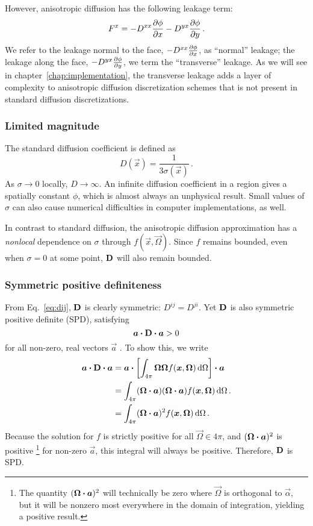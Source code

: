However, anisotropic diffusion has the following leakage term:
\begin{equation*}
  F^x = - D^{xx} \frac{\partial \phi}{\partial x} - D^{yx} \frac{\partial \phi}{\partial y}\,.
\end{equation*}
We refer to the leakage normal to the face, $- D^{xx} \frac{\partial \phi}{\partial x}$, as
``normal'' leakage; the leakage along the face, $- D^{yx}
\frac{\partial \phi}{\partial y}$, we term the ``transverse'' leakage. As we will see in
chapter~\ref{chap:implementation}, the transverse leakage adds a layer of
complexity to anisotropic diffusion discretization schemes that is not present
in standard diffusion discretizations.

\subsubsection{Limited magnitude}
The standard diffusion coefficient is defined as
\begin{equation*}
  D(\vec{x}) = \frac{1}{3\sigma(\vec{x})} \,.
\end{equation*}
As $\sigma\to0$ locally, $D\to \infty$. An infinite diffusion coefficient in a
region gives a spatially constant $\phi$, which is almost always an
unphysical result. Small values of $\sigma$ can also cause numerical
difficulties in computer implementations, as well.

In contrast to standard diffusion, the anisotropic diffusion approximation has
a \emph{nonlocal} dependence on $\sigma$ through $f(\vec{x}, \vec{\Omega})$. Since $f$ remains
bounded, even when $\sigma=0$ at some point, $\mathbf{D}$ will also remain bounded.

\subsubsection{Symmetric positive definiteness}
From Eq.~\eqref{eq:dij}, $\mathbf{D}$ is clearly symmetric: $D^{ij}=D^{ji}$. Yet
$\mathbf{D}$ is also symmetric positive definite (SPD), satisfying
\begin{equation*}
  \bm{a} \bm{\cdot} \mathbf{D} \bm{\cdot} \bm{a} > 0
\end{equation*}
for all non-zero, real vectors $\vec{a}$ \cite{Tre1997}. To show this, we write 
\begin{align*}
  \bm{a} \bm{\cdot} \mathbf{D} \bm{\cdot} \bm{a} &=
  \bm{a} \bm{\cdot} \left[\int_{4\pi} \bm{\Omega} \bm{\Omega}
  f(\bm{x}, \bm{\Omega}) \mathop{}\!\mathrm{d}\Omega\right] \bm{\cdot} \bm{a}
  \\
  &=
  \int_{4\pi} (\bm{\Omega} \bm{\cdot}
  \bm{a}) (\bm{\Omega} \bm{\cdot} \bm{a})
  f(\bm{x}, \bm{\Omega}) \mathop{}\!\mathrm{d}\Omega\,.
  \\
  &=
  \int_{4\pi} (\bm{\Omega} \bm{\cdot} \bm{a})^2
  f(\bm{x}, \bm{\Omega}) \mathop{}\!\mathrm{d}\Omega\,.
\end{align*}
Because the solution for $f$ is strictly positive for all $\vec{\Omega}\in
4\pi$, and $(\bm{\Omega} \bm{\cdot} \bm{a})^2$ is positive%
\footnote{The quantity $(\bm{\Omega} \bm{\cdot} \bm{a})^2$ will technically be zero where
$\vec{\Omega}$ is orthogonal to $\vec{\alpha}$, but it will be nonzero most
everywhere in the domain of integration, yielding a positive result.
}%
for non-zero
$\vec{a}$, this integral will always be positive. Therefore, $\mathbf{D}$ is SPD.

